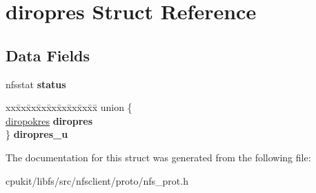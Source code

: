 \hypertarget{structdiropres}{}\section{diropres Struct Reference}
\label{structdiropres}
\subsection*{Data Fields}
\begin{DoxyCompactItemize}
\item 
\mbox{\label{structdiropres_a633345b3e56a5e8fd2cee8c3732f5d8c}} 
nfsstat {\bfseries status}
\item 
\mbox{\label{structdiropres_adb8e97119f6eed0101ac6071112a8487}} 
\begin{tabbing}
xx\=xx\=xx\=xx\=xx\=xx\=xx\=xx\=xx\=\kill
union \{\\
\>\mbox{\hyperlink{structdiropokres}{diropokres}} {\bfseries diropres}\\
\} {\bfseries diropres\_u}\\

\end{tabbing}\end{DoxyCompactItemize}


The documentation for this struct was generated from the following file\+:\begin{DoxyCompactItemize}
\item 
cpukit/libfs/src/nfsclient/proto/nfs\+\_\+prot.\+h\end{DoxyCompactItemize}
